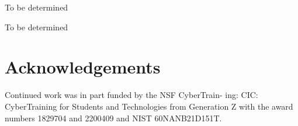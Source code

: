 \documentclass[11pt,twocolumn]{article}
\begin{document}

\begin{table}[htb]

\caption{To be determined}
\label{tab:tbd}
\bigskip
\centering%
\end{table}

\begin{table}[htb]

\caption{To be determined}
\label{tab:tbdetermined}
\bigskip
\centering%
\end{table}

\section*{Acknowledgements}

Continued work was in part funded by the NSF CyberTrain-
ing: CIC: CyberTraining for Students and Technologies from
Generation Z with the award numbers 1829704 and 2200409
and NIST 60NANB21D151T.

\clearpage



\end{document}

